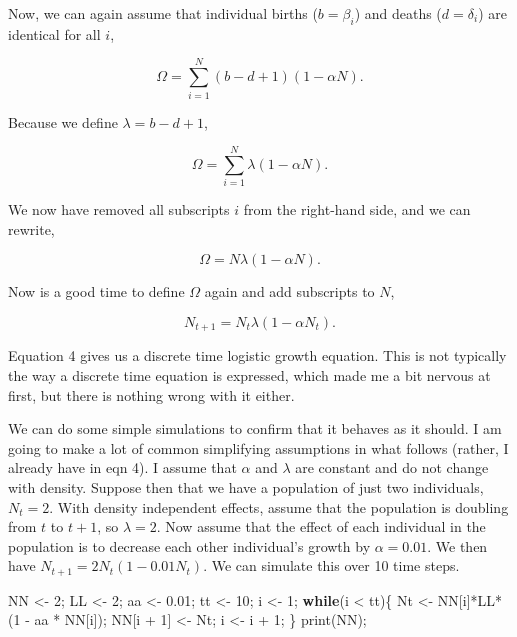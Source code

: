 \documentclass[
]{article}
\newenvironment{Shaded}{\begin{snugshade}}{\end{snugshade}}
\newcommand{\ControlFlowTok}[1]{\textcolor[rgb]{0.13,0.29,0.53}{\textbf{#1}}}
\newcommand{\DecValTok}[1]{\textcolor[rgb]{0.00,0.00,0.81}{#1}}
\newcommand{\FloatTok}[1]{\textcolor[rgb]{0.00,0.00,0.81}{#1}}
\newcommand{\FunctionTok}[1]{\textcolor[rgb]{0.00,0.00,0.00}{#1}}
\newcommand{\NormalTok}[1]{#1}
\newcommand{\OtherTok}[1]{\textcolor[rgb]{0.56,0.35,0.01}{#1}}
\newcommand{\SpecialCharTok}[1]{\textcolor[rgb]{0.00,0.00,0.00}{#1}}
\begin{document}
Now, we can again assume that individual births (\(b = \beta_{i}\)) and
deaths (\(d = \delta_{i}\)) are identical for all \(i\),

\[\Omega = \sum_{i=1}^{N} \left(b -d + 1 \right)\left(1 - \alpha N \right).
\]

Because we define \(\lambda = b - d + 1\),

\[\Omega = \sum_{i=1}^{N} \lambda\left(1 - \alpha N \right).
\]

We now have removed all subscripts \(i\) from the right-hand side, and
we can rewrite,

\[\Omega =  N \lambda\left(1 - \alpha N \right).
\]

Now is a good time to define \(\Omega\) again and add subscripts to
\(N\),

\[N_{t+1} =  N_{t} \lambda\left(1 - \alpha N_{t} \right).
\tag{4}
\]

Equation 4 gives us a discrete time logistic growth equation. This is
not typically the way a discrete time equation is expressed, which made
me a bit nervous at first, but there is nothing wrong with it either.

We can do some simple simulations to confirm that it behaves as it
should. I am going to make a lot of common simplifying assumptions in
what follows (rather, I already have in eqn 4). I assume that \(\alpha\)
and \(\lambda\) are constant and do not change with density. Suppose
then that we have a population of just two individuals, \(N_{t} = 2\).
With density independent effects, assume that the population is doubling
from \(t\) to \(t + 1\), so \(\lambda = 2\). Now assume that the effect
of each individual in the population is to decrease each other
individual's growth by \(\alpha = 0.01\). We then have
\(N_{t+1} = 2 N_{t} \left(1 - 0.01 N_{t} \right)\). We can simulate this
over 10 time steps.

\begin{Shaded}
\begin{Highlighting}[]
\NormalTok{NN }\OtherTok{\textless{}{-}} \DecValTok{2}\NormalTok{;}
\NormalTok{LL }\OtherTok{\textless{}{-}} \DecValTok{2}\NormalTok{;}
\NormalTok{aa }\OtherTok{\textless{}{-}} \FloatTok{0.01}\NormalTok{;}
\NormalTok{tt }\OtherTok{\textless{}{-}} \DecValTok{10}\NormalTok{;}
\NormalTok{i  }\OtherTok{\textless{}{-}} \DecValTok{1}\NormalTok{;}
\ControlFlowTok{while}\NormalTok{(i }\SpecialCharTok{\textless{}}\NormalTok{ tt)\{}
\NormalTok{    Nt        }\OtherTok{\textless{}{-}}\NormalTok{ NN[i]}\SpecialCharTok{*}\NormalTok{LL}\SpecialCharTok{*}\NormalTok{(}\DecValTok{1} \SpecialCharTok{{-}}\NormalTok{ aa }\SpecialCharTok{*}\NormalTok{ NN[i]);}
\NormalTok{    NN[i }\SpecialCharTok{+} \DecValTok{1}\NormalTok{] }\OtherTok{\textless{}{-}}\NormalTok{ Nt;}
\NormalTok{    i         }\OtherTok{\textless{}{-}}\NormalTok{ i }\SpecialCharTok{+} \DecValTok{1}\NormalTok{;}
\NormalTok{\}}
\FunctionTok{print}\NormalTok{(NN);}
\end{Highlighting}
\end{Shaded}
\end{document}
